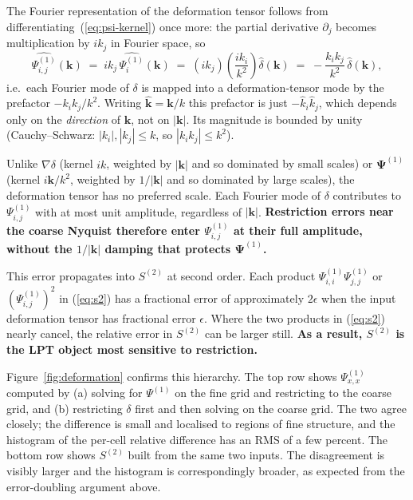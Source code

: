 \documentclass[12pt]{article}
\begin{document}
The Fourier representation of the deformation tensor follows from
differentiating~(\ref{eq:psi-kernel}) once more: the partial derivative
$\partial_j$ becomes multiplication by $ik_j$ in Fourier space, so
\begin{equation}
  \widehat{\Psi^{(1)}_{i,j}}(\mathbf k)
    \;=\; ik_j\,\widehat{\Psi^{(1)}_i}(\mathbf k)
    \;=\; (ik_j)\!\left(\frac{ik_i}{k^2}\right)\hat\delta(\mathbf k)
    \;=\; -\frac{k_ik_j}{k^2}\,\hat\delta(\mathbf k),
\end{equation}
i.e.\ each Fourier mode of $\delta$ is mapped into a deformation-tensor
mode by the prefactor $-k_ik_j/k^2$. Writing $\hat{\mathbf k}=\mathbf k/k$
this prefactor is just $-\hat k_i \hat k_j$, which depends only on the
\emph{direction} of $\mathbf k$, not on $|\mathbf k|$. Its magnitude
is bounded by unity (Cauchy--Schwarz: $|k_i|, |k_j| \le k$, so
$|k_ik_j|\le k^2$).

Unlike $\nabla\delta$ (kernel $ik$, weighted by $|\mathbf k|$ and so
dominated by small scales) or $\boldsymbol\Psi^{(1)}$ (kernel
$i\mathbf k/k^2$, weighted by $1/|\mathbf k|$ and so dominated by
large scales), the deformation tensor has no preferred scale. Each
Fourier mode of $\delta$ contributes to $\Psi^{(1)}_{i,j}$ with at
most unit amplitude, regardless of $|\mathbf k|$. \textbf{Restriction
errors near the coarse Nyquist therefore enter $\Psi^{(1)}_{i,j}$ at
their full amplitude, without the $1/|\mathbf k|$ damping that
protects $\boldsymbol\Psi^{(1)}$.}

This error propagates into $S^{(2)}$ at second order. Each product
$\Psi^{(1)}_{i,i}\Psi^{(1)}_{j,j}$ or $(\Psi^{(1)}_{i,j})^2$ in
(\ref{eq:s2}) has a fractional error of approximately $2\epsilon$ when
the input deformation tensor has fractional error $\epsilon$. Where
the two products in (\ref{eq:s2}) nearly cancel, the relative error in
$S^{(2)}$ can be larger still. \textbf{As a result, $S^{(2)}$ is the LPT object
most sensitive to restriction.}

Figure~\ref{fig:deformation} confirms this hierarchy. The top row
shows $\Psi^{(1)}_{x,x}$ computed by (a) solving for $\Psi^{(1)}$ on
the fine grid and restricting to the coarse grid, and (b) restricting
$\delta$ first and then solving on the coarse grid. The two agree
closely; the difference is small and localised to regions of fine
structure, and the histogram of the per-cell relative difference has
an RMS of a few percent. The bottom row shows $S^{(2)}$ built from
the same two inputs. The disagreement is visibly larger and the
histogram is correspondingly broader, as expected from the
error-doubling argument above.
\end{document}
